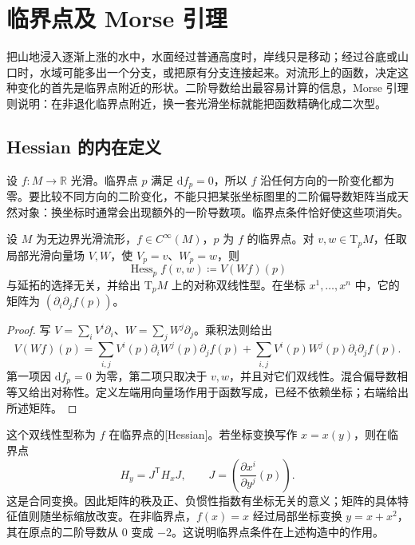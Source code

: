 
% 
% 

\section{临界点及 Morse 引理}
\label{g2:sec:1701}

把山地浸入逐渐上涨的水中，水面经过普通高度时，岸线只是移动；经过谷底或山口时，水域可能多出一个分支，或把原有分支连接起来。对流形上的函数，决定这种变化的首先是临界点附近的形状。二阶导数给出最容易计算的信息，Morse 引理则说明：在非退化临界点附近，换一套光滑坐标就能把函数精确化成二次型。

\subsection{Hessian 的内在定义}
\label{g2:subsec:1701:01}

设 \(f:M\to\mathbb R\) 光滑。临界点 \(p\) 满足 \(\mathrm df_p=0\)，所以 \(f\) 沿任何方向的一阶变化都为零。要比较不同方向的二阶变化，不能只把某张坐标图里的二阶偏导数矩阵当成天然对象：换坐标时通常会出现额外的一阶导数项。临界点条件恰好使这些项消失。

\begin{proposition}\label{g2:prop:critical-hessian-intrinsic}
	设 \(M\) 为无边界光滑流形，\(f\in C^\infty(M)\)，\(p\) 为 \(f\) 的临界点。对 \(v,w\in\mathrm T_pM\)，任取局部光滑向量场 \(V,W\)，使 \(V_p=v\)、\(W_p=w\)，则
	\[
		\operatorname{Hess}_pf(v,w)\coloneqq V(Wf)(p)
	\]
	与延拓的选择无关，并给出 \(\mathrm T_pM\) 上的对称双线性型。在坐标 \(x^1,\ldots,x^n\) 中，它的矩阵为 \((\partial_i\partial_jf(p))\)。
\end{proposition}
\begin{proof}
	写 \(V=\sum_iV^i\partial_i\)、\(W=\sum_jW^j\partial_j\)。乘积法则给出
	\[
		V(Wf)(p)=\sum_{i,j}V^i(p)\partial_iW^j(p)\partial_jf(p)
		+\sum_{i,j}V^i(p)W^j(p)\partial_i\partial_jf(p).
	\]
	第一项因 \(\mathrm df_p=0\) 为零，第二项只取决于 \(v,w\)，并且对它们双线性。混合偏导数相等又给出对称性。定义左端用向量场作用于函数写成，已经不依赖坐标；右端给出所述矩阵。
\end{proof}

这个双线性型称为 \(f\) 在临界点的[Hessian]。若坐标变换写作 \(x=x(y)\)，则在临界点
\[
	H_y=J^{\mathsf T}H_xJ,\qquad J=\left(\frac{\partial x^i}{\partial y^j}(p)\right).
\]
这是合同变换。因此矩阵的秩及正、负惯性指数有坐标无关的意义；矩阵的具体特征值则随坐标缩放改变。在非临界点，\(f(x)=x\) 经过局部坐标变换 \(y=x+x^2\)，其在原点的二阶导数从 \(0\) 变成 \(-2\)。这说明临界点条件在上述构造中的作用。

